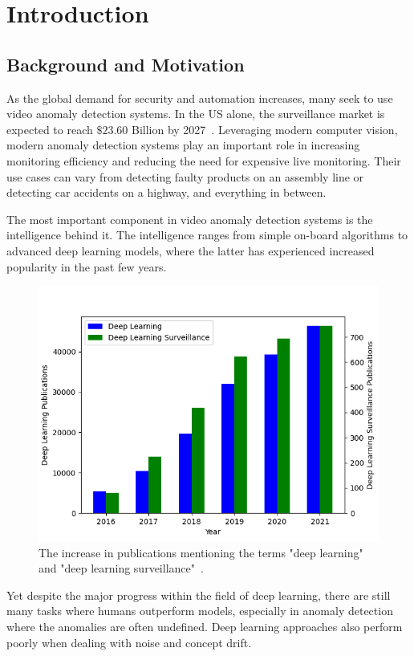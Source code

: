 \chapter{Introduction}
\label{sec:introduction}
\section{Background and Motivation}
As the global demand for security and automation increases, many seek to use video anomaly detection systems. In the US alone, the surveillance market is expected to reach $\$23.60$ Billion by 2027~\cite{us_video_stats}. Leveraging modern computer vision, modern anomaly detection systems play an important role in increasing monitoring efficiency and reducing the need for expensive live monitoring. Their use cases can vary from detecting faulty products on an assembly line or detecting car accidents on a highway, and everything in between.
\par
The most important component in video anomaly detection systems is the intelligence behind it. The intelligence ranges from simple on-board algorithms to advanced deep learning models, where the latter has experienced increased popularity in the past few years.\par
\begin{figure}[H]
    \centering
    \includegraphics[width=\linewidth]{resources/introduction/publications_graph.png}
    \caption{The increase in publications mentioning the terms "deep learning" and "deep learning surveillance"~\cite{deep_learning_surveillance_stats}.}
\end{figure}
Yet despite the major progress within the field of deep learning, there are still many tasks where humans outperform models, especially in anomaly detection where the anomalies are often undefined. Deep learning approaches also perform poorly when dealing with noise and concept drift.
